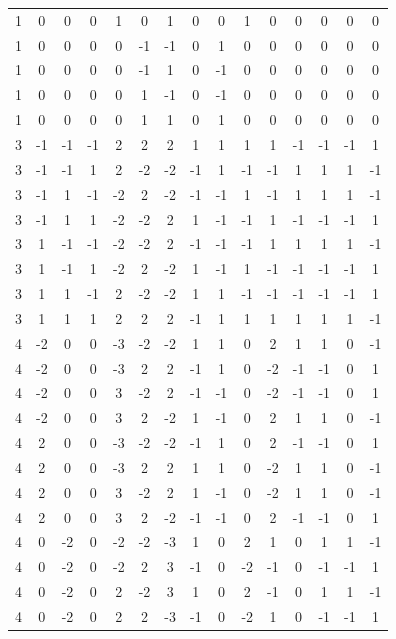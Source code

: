 \documentclass[aps,english,10pt,superscriptaddress,onecolumn,twoside,longbibliography,pra,floatfix,fleqn,nofootinbib]{revtex4-1}%
\theoremstyle{definition}
\begin{document}
{\begin{table}[hb]
{\begin{tabular}{c@{\hspace{1em}}ccc@{\hspace{1em}}ccc@{\hspace{1em}}c@{\hspace{1em}}ccc@{\hspace{1em}}ccc@{\hspace{1em}}c}
 1 & 0 & 0 & 0 & 1 & 0 & 1 & 0 & 0 & 1 & 0 & 0 & 0 & 0 & 0 \\
 1 & 0 & 0 & 0 & 0 & -1 & -1 & 0 & 1 & 0 & 0 & 0 & 0 & 0 & 0 \\
 1 & 0 & 0 & 0 & 0 & -1 & 1 & 0 & -1 & 0 & 0 & 0 & 0 & 0 & 0 \\
 1 & 0 & 0 & 0 & 0 & 1 & -1 & 0 & -1 & 0 & 0 & 0 & 0 & 0 & 0 \\
 1 & 0 & 0 & 0 & 0 & 1 & 1 & 0 & 1 & 0 & 0 & 0 & 0 & 0 & 0 \\
 3 & -1 & -1 & -1 & 2 & 2 & 2 & 1 & 1 & 1 & 1 & -1 & -1 & -1 & 1 \\
 3 & -1 & -1 & 1 & 2 & -2 & -2 & -1 & 1 & -1 & -1 & 1 & 1 & 1 & -1 \\
 3 & -1 & 1 & -1 & -2 & 2 & -2 & -1 & -1 & 1 & -1 & 1 & 1 & 1 & -1 \\
 3 & -1 & 1 & 1 & -2 & -2 & 2 & 1 & -1 & -1 & 1 & -1 & -1 & -1 & 1 \\
 3 & 1 & -1 & -1 & -2 & -2 & 2 & -1 & -1 & -1 & 1 & 1 & 1 & 1 & -1 \\
 3 & 1 & -1 & 1 & -2 & 2 & -2 & 1 & -1 & 1 & -1 & -1 & -1 & -1 & 1 \\
 3 & 1 & 1 & -1 & 2 & -2 & -2 & 1 & 1 & -1 & -1 & -1 & -1 & -1 & 1 \\
 3 & 1 & 1 & 1 & 2 & 2 & 2 & -1 & 1 & 1 & 1 & 1 & 1 & 1 & -1 \\
 4 & -2 & 0 & 0 & -3 & -2 & -2 & 1 & 1 & 0 & 2 & 1 & 1 & 0 & -1 \\
 4 & -2 & 0 & 0 & -3 & 2 & 2 & -1 & 1 & 0 & -2 & -1 & -1 & 0 & 1 \\
 4 & -2 & 0 & 0 & 3 & -2 & 2 & -1 & -1 & 0 & -2 & -1 & -1 & 0 & 1 \\
 4 & -2 & 0 & 0 & 3 & 2 & -2 & 1 & -1 & 0 & 2 & 1 & 1 & 0 & -1 \\
 4 & 2 & 0 & 0 & -3 & -2 & -2 & -1 & 1 & 0 & 2 & -1 & -1 & 0 & 1 \\
 4 & 2 & 0 & 0 & -3 & 2 & 2 & 1 & 1 & 0 & -2 & 1 & 1 & 0 & -1 \\
 4 & 2 & 0 & 0 & 3 & -2 & 2 & 1 & -1 & 0 & -2 & 1 & 1 & 0 & -1 \\
 4 & 2 & 0 & 0 & 3 & 2 & -2 & -1 & -1 & 0 & 2 & -1 & -1 & 0 & 1 \\
 4 & 0 & -2 & 0 & -2 & -2 & -3 & 1 & 0 & 2 & 1 & 0 & 1 & 1 & -1 \\
 4 & 0 & -2 & 0 & -2 & 2 & 3 & -1 & 0 & -2 & -1 & 0 & -1 & -1 & 1 \\
 4 & 0 & -2 & 0 & 2 & -2 & 3 & 1 & 0 & 2 & -1 & 0 & 1 & 1 & -1 \\
 4 & 0 & -2 & 0 & 2 & 2 & -3 & -1 & 0 & -2 & 1 & 0 & -1 & -1 & 1 \\

\end{tabular}}
\end{table}}
\end{document}
